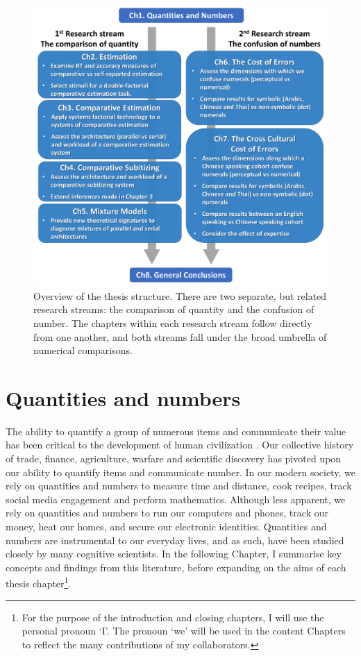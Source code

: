 \begin{figure}[tbh]
\centering \includegraphics[width = \linewidth]{Figures/Intro/ThesisSummary.pdf}
\caption{Overview of the thesis structure. There are two separate, but related research streams: the comparison of quantity and the confusion of number. The chapters within each research stream follow directly from one another, and both streams fall under the broad umbrella of numerical comparisons.}
\label{fig:ThesisSummary}
\end{figure}


\section{Quantities and numbers}
The ability to quantify a group of numerous items and communicate their value has been critical to the development of human civilization \cite{menninger2013number}. Our collective history of trade, finance, agriculture, warfare and scientific discovery has pivoted upon our ability to quantify items and communicate number. In our modern society, we rely on quantities and numbers to measure time and distance, cook recipes, track social media engagement and perform mathematics. Although less apparent, we rely on quantities and numbers to run our computers and phones, track our money, heat our homes, and secure our electronic identities. Quantities and numbers are instrumental to our everyday lives, and as such, have been studied closely by many cognitive scientists. In the following Chapter, I summarise key concepts and findings from this literature, before expanding on the aims of each thesis chapter\footnote{For the purpose of the introduction and closing chapters, I will use the personal pronoun `I'. The pronoun `we' will be used in the content Chapters to reflect the many contributions of my collaborators.}. 

